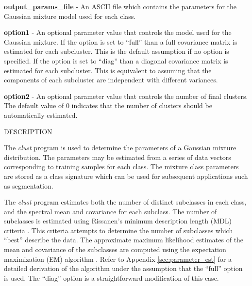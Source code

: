 \documentclass[12pt]{article}
\begin{document}
\begin{description}
\begin{description}
\item {\bf output\_params\_file} - 
An ASCII file which contains the 
parameters for the Gaussian mixture model used for each class.

\item {\bf option1} -  
An optional parameter value that controls the model used for
the Gaussian mixture. 
If the option is set to ``full'' than a full covariance matrix
is estimated for each subcluster.
This is the default assumption if no option is specified.
If the option is set to ``diag'' than a diagonal covariance matrix
is estimated for each subcluster.
This is equivalent to assuming that the components of each
subcluster are independent with different variances.

\item {\bf option2} -
An optional parameter value that controls the number of final clusters.
The default value of 0 indicates that the number of clusters should
be automatically estimated.

\end{description}



 \item DESCRIPTION

The {\em clust} program is used to determine the parameters
of a Gaussian mixture distribution.
The parameters may be estimated from a series of data
vectors corresponding to training samples for each 
class.
The mixture class parameters are stored as a class signature
which can be used 
for subsequent applications such as segmentation.

The {\em clust} program estimates both the number
of distinct subclasses in each class, 
and the spectral mean and covariance for each subclass.
The number of subclasses is estimated using 
Rissanen's minimum description length (MDL) criteria \cite{Ri83}.
This criteria attempts to determine the number of subclasses
which ``best'' describe the data.
The approximate maximum likelihood estimates
of the mean and covariance of the subclasses are computed using
the expectation maximization (EM) algorithm \cite{DeLaRu77,ReWa84}.
Refer to Appendix \ref{sec:parameter_est} for a detailed
derivation of the algorithm under the assumption that
the ``full'' option is used. 
The ``diag'' option is a straightforward modification
of this case.

\end{description}
\end{document}
